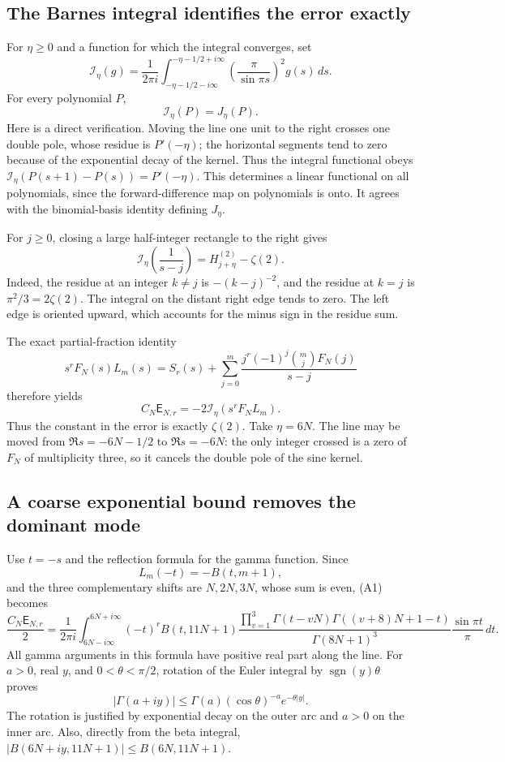 \documentclass[11pt]{article}
\begin{document}
\subsection{The Barnes integral identifies the error exactly}
For $\eta\ge0$ and a function for which the integral converges, set
\[
 \mathcal I_\eta(g)=\frac1{2\pi i}
 \int_{-\eta-1/2-i\infty}^{-\eta-1/2+i\infty}
 \left(\frac\pi{\sin\pi s}\right)^2g(s)\,ds.
\]
For every polynomial $P$,
\[
 \mathcal I_\eta(P)=J_\eta(P).
\]
Here is a direct verification.  Moving the line one unit to the right
crosses one double pole, whose residue is $P'(-\eta)$; the horizontal
segments tend to zero because of the exponential decay of the kernel.
Thus the integral functional obeys
$\mathcal I_\eta(P(s+1)-P(s))=P'(-\eta)$.
This determines a linear functional on all polynomials, since the
forward-difference map on polynomials is onto.  It agrees with the
binomial-basis identity defining $J_\eta$.

For $j\ge0$, closing a large half-integer rectangle to the right gives
\[
 \mathcal I_\eta\!\left(\frac1{s-j}\right)
 =H_{j+\eta}^{(2)}-\zeta(2).
\]
Indeed, the residue at an integer $k\ne j$ is $-(k-j)^{-2}$, and the
residue at $k=j$ is $\pi^2/3=2\zeta(2)$.  The integral on the distant
right edge tends to zero.  The left edge is oriented upward, which
accounts for the minus sign in the residue sum.

The exact partial-fraction identity
\[
 s^rF_N(s)L_m(s)=S_r(s)+
 \sum_{j=0}^m\frac{j^r(-1)^j\binom mjF_N(j)}{s-j}
\]
therefore yields
\[
 \boxed{\quad C_N\mathsf E_{N,r}
       =-2\mathcal I_\eta(s^rF_NL_m).\quad}                 \tag{A1}
\]
Thus the constant in the error is exactly $\zeta(2)$.
Take $\eta=6N$.  The line may be moved from $\Re s=-6N-1/2$ to
$\Re s=-6N$: the only integer crossed is a zero of $F_N$ of
multiplicity three, so it cancels the double pole of the sine kernel.

\subsection{A coarse exponential bound removes the dominant mode}
Use $t=-s$ and the reflection formula for the gamma function.  Since
\[
 L_m(-t)=-B(t,m+1),
\]
and the three complementary shifts are $N,2N,3N$, whose sum is even,
(A1) becomes
\[
 \frac{C_N\mathsf E_{N,r}}2
 =\frac1{2\pi i}\int_{6N-i\infty}^{6N+i\infty}
 (-t)^r B(t,11N+1)
 \frac{\prod_{v=1}^3\Gamma(t-vN)\Gamma((v+8)N+1-t)}
      {\Gamma(8N+1)^3}
 \frac{\sin\pi t}{\pi}\,dt.                              \tag{A2}
\]
All gamma arguments in this formula have positive real part along the
line.  For $a>0$, real $y$, and $0<\theta<\pi/2$, rotation of the Euler
integral by $\operatorname{sgn}(y)\theta$ proves
\[
 |\Gamma(a+iy)|\le\Gamma(a)(\cos\theta)^{-a}
                                  e^{-\theta|y|}.
\]
The rotation is justified by exponential decay on the outer arc and
$a>0$ on the inner arc.  Also, directly from the beta integral,
$|B(6N+iy,11N+1)|\le B(6N,11N+1)$.
\end{document}
